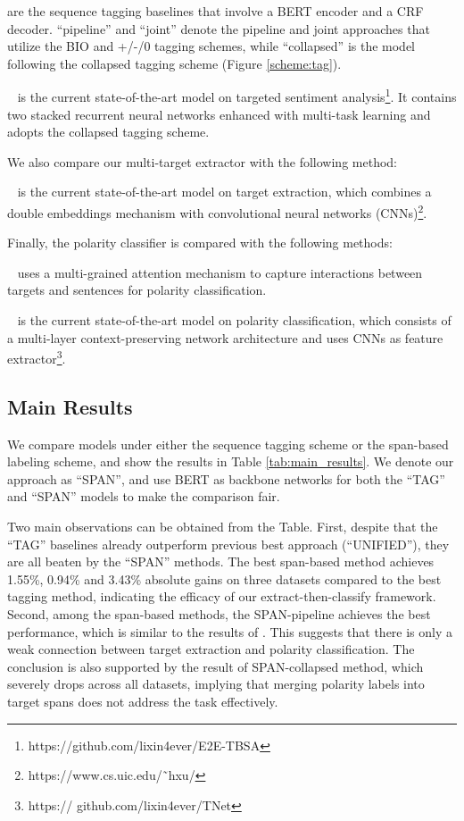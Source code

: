 \documentclass[11pt,a4paper]{article}
\newcommand\bertlarge{BERT\xspace}
\begin{document}
 are the sequence tagging baselines that involve a BERT encoder and a CRF decoder. ``pipeline'' and ``joint'' denote the pipeline and joint approaches that utilize the BIO and +/-/0 tagging schemes, while ``collapsed'' is the model following the collapsed tagging scheme (Figure \ref{scheme:tag}).

~\cite{li2018unified} is the current state-of-the-art model on targeted sentiment analysis\footnote{https://github.com/lixin4ever/E2E-TBSA}. It contains two stacked recurrent neural networks enhanced with multi-task learning and adopts the collapsed tagging scheme.

We also compare our multi-target extractor with the following method:

~\cite{xu2018double} is the current state-of-the-art model on target extraction, which combines a double embeddings mechanism with convolutional neural networks (CNNs)\footnote{https://www.cs.uic.edu/˜hxu/}.

Finally, the polarity classifier is compared with the following methods:

~\cite{fan2018multi} uses a multi-grained attention mechanism to capture interactions between targets and sentences for polarity classification.

~\cite{li2018transformation} is the current state-of-the-art model on polarity classification, which consists of a multi-layer context-preserving network architecture and uses CNNs as feature extractor\footnote{https:// github.com/lixin4ever/TNet}.


\subsection{Main Results}
We compare models under either the sequence tagging scheme or the span-based labeling scheme, and show the results in Table \ref{tab:main_results}.
We denote our approach as ``SPAN'', and use \bertlarge as backbone networks for both the ``TAG'' and ``SPAN'' models to make the comparison fair.

Two main observations can be obtained from the Table.
First, despite that the ``TAG'' baselines already outperform previous best approach (``UNIFIED''), they are all beaten by the ``SPAN'' methods.
The best span-based method achieves 1.55\%, 0.94\% and 3.43\% absolute gains on three datasets compared to the best tagging method, indicating the efficacy of our extract-then-classify framework.
Second, among the span-based methods, the SPAN-pipeline achieves the best performance, which is similar to the results of \citet{mitchell2013open,zhang2015neural}. 
This suggests that there is only a weak connection between target extraction and polarity classification.
The conclusion is also supported by the result of SPAN-collapsed method, which severely drops across all datasets, implying that merging polarity labels into target spans does not address the task effectively.
\end{document}
